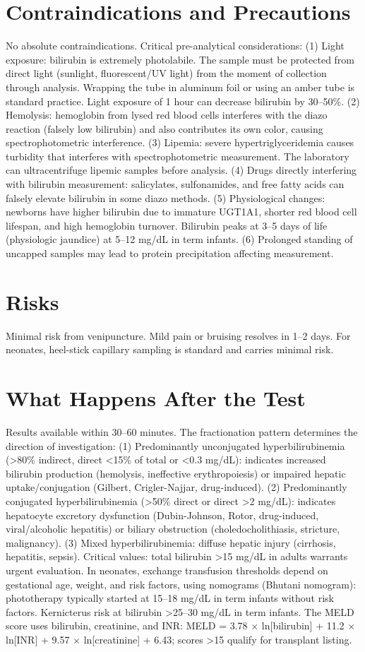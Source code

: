 \section*{Contraindications and Precautions}
No absolute contraindications. Critical pre-analytical considerations: (1) Light exposure: bilirubin is extremely photolabile. The sample must be protected from direct light (sunlight, fluorescent/UV light) from the moment of collection through analysis. Wrapping the tube in aluminum foil or using an amber tube is standard practice. Light exposure of 1 hour can decrease bilirubin by 30--50\%. (2) Hemolysis: hemoglobin from lysed red blood cells interferes with the diazo reaction (falsely low bilirubin) and also contributes its own color, causing spectrophotometric interference. (3) Lipemia: severe hypertriglyceridemia causes turbidity that interferes with spectrophotometric measurement. The laboratory can ultracentrifuge lipemic samples before analysis. (4) Drugs directly interfering with bilirubin measurement: salicylates, sulfonamides, and free fatty acids can falsely elevate bilirubin in some diazo methods. (5) Physiological changes: newborns have higher bilirubin due to immature UGT1A1, shorter red blood cell lifespan, and high hemoglobin turnover. Bilirubin peaks at 3--5 days of life (physiologic jaundice) at 5--12 mg/dL in term infants. (6) Prolonged standing of uncapped samples may lead to protein precipitation affecting measurement.

\section*{Risks}
Minimal risk from venipuncture. Mild pain or bruising resolves in 1--2 days. For neonates, heel-stick capillary sampling is standard and carries minimal risk.

\section*{What Happens After the Test}
Results available within 30--60 minutes. The fractionation pattern determines the direction of investigation: (1) Predominantly unconjugated hyperbilirubinemia (>80\% indirect, direct <15\% of total or <0.3 mg/dL): indicates increased bilirubin production (hemolysis, ineffective erythropoiesis) or impaired hepatic uptake/conjugation (Gilbert, Crigler-Najjar, drug-induced). (2) Predominantly conjugated hyperbilirubinemia (>50\% direct or direct >2 mg/dL): indicates hepatocyte excretory dysfunction (Dubin-Johnson, Rotor, drug-induced, viral/alcoholic hepatitis) or biliary obstruction (choledocholithiasis, stricture, malignancy). (3) Mixed hyperbilirubinemia: diffuse hepatic injury (cirrhosis, hepatitis, sepsis). Critical values: total bilirubin >15 mg/dL in adults warrants urgent evaluation. In neonates, exchange transfusion thresholds depend on gestational age, weight, and risk factors, using nomograms (Bhutani nomogram): phototherapy typically started at 15--18 mg/dL in term infants without risk factors. Kernicterus risk at bilirubin >25--30 mg/dL in term infants. The MELD score uses bilirubin, creatinine, and INR: MELD = 3.78 $\times$ ln[bilirubin] + 11.2 $\times$ ln[INR] + 9.57 $\times$ ln[creatinine] + 6.43; scores >15 qualify for transplant listing.

